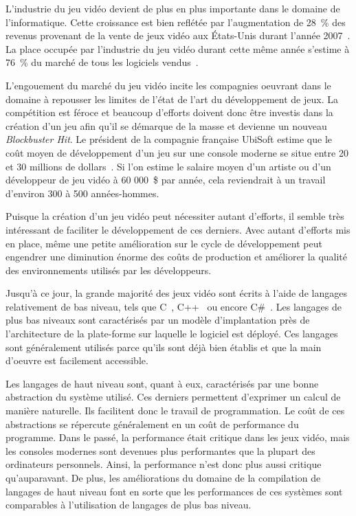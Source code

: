\documentclass[12pt,twoside,letterpaper,francais]{book}
\begin{document}
L'industrie du jeu vidéo devient de plus en plus importante dans le
domaine de l'informatique. Cette croissance est bien reflétée par
l'augmentation de 28~\% des revenus provenant de la vente de jeux vidéo
aux États-Unis durant l'année 2007~\cite{NPD_Games_2007}. La place
occupée par l'industrie du jeu vidéo durant cette même année s'estime
à 76~\% du marché de tous les logiciels vendus~\cite{NPD_Soft_2008}. 

L'engouement du marché du jeu vidéo incite les compagnies oeuvrant
dans le domaine à repousser les limites de l'état de l'art du
développement de jeux. La compétition est féroce et beaucoup d'efforts
doivent donc être investis dans la création d'un jeu afin qu'il se
démarque de la masse et devienne un nouveau \textit{Blockbuster
  Hit}. Le président de la compagnie française UbiSoft estime que le
coût moyen de développement d'un jeu sur une console moderne se situe
entre 20 et 30 millions de dollars~\cite{cbc_ubisoft}. Si l'on estime
le salaire moyen d'un artiste ou d'un développeur de jeu vidéo à 60
000~\$ par année, cela reviendrait à un travail d'environ 300 à 500
années-hommes.

Puisque la création d'un jeu vidéo peut nécessiter autant d'efforts,
il semble très intéressant de faciliter le développement de ces
derniers. Avec autant d'efforts mis en place, même une petite
amélioration sur le cycle de développement peut engendrer une
diminution énorme des coûts de production et améliorer la qualité des
environnements utilisés par les développeurs.

Jusqu'à ce jour, la grande majorité des jeux vidéo sont écrits à
l'aide de langages relativement de bas niveau, tels que
C~\cite{Ritchie-C-dev}, C++~\cite{cplusplus} ou encore
C\#~\cite{CSHARP_SPEC}. Les langages de plus bas niveaux sont
caractérisés par un modèle d'implantation près de l'architecture de la
plate-forme sur laquelle le logiciel est déployé. Ces langages sont
généralement utilisés parce qu'ils sont déjà bien établis et que la
main d'oeuvre est facilement accessible.

Les langages de haut niveau sont, quant à eux, caractérisés par une
bonne abstraction du système utilisé. Ces derniers permettent
d'exprimer un calcul de manière naturelle. Ils facilitent donc le
travail de programmation. Le coût de ces abstractions se répercute
généralement en un coût de performance du programme. Dans le passé, la
performance était critique dans les jeux vidéo, mais les consoles
modernes sont devenues plus performantes que la plupart des
ordinateurs personnels. Ainsi, la performance n'est donc plus aussi
critique qu'auparavant. De plus, les améliorations du domaine de la
compilation de langages de haut niveau font en sorte que les
performances de ces systèmes sont comparables à l'utilisation de
langages de plus bas niveau.
\end{document}
